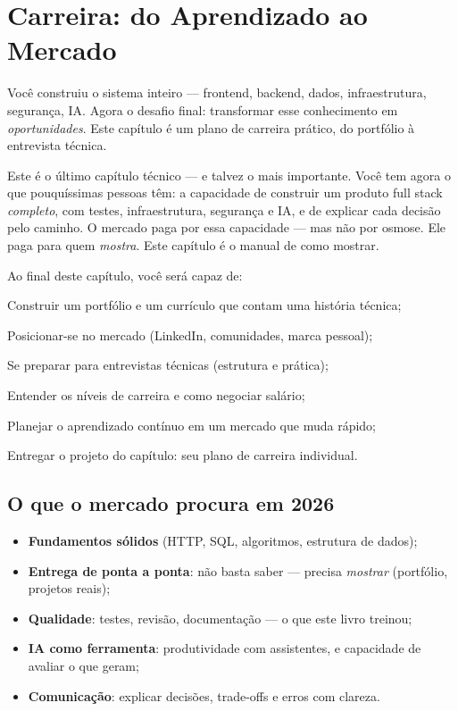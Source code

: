 \chapter{Carreira: do Aprendizado ao Mercado}
\label{cap:carreira}

\begin{caixaconceito}
Você construiu o sistema inteiro — frontend, backend, dados, infraestrutura,
segurança, IA. Agora o desafio final: transformar esse conhecimento em
\emph{oportunidades}. Este capítulo é um plano de carreira prático, do
portfólio à entrevista técnica.
\end{caixaconceito}

Este é o último capítulo técnico — e talvez o mais importante. Você tem agora
o que pouquíssimas pessoas têm: a capacidade de construir um produto full
stack \emph{completo}, com testes, infraestrutura, segurança e IA, e de
explicar cada decisão pelo caminho. O mercado paga por essa capacidade — mas
não por osmose. Ele paga para quem \emph{mostra}. Este capítulo é o manual de
como mostrar.

Ao final deste capítulo, você será capaz de:
\begin{objetivos}
  \item Construir um portfólio e um currículo que contam uma história técnica;
  \item Posicionar-se no mercado (LinkedIn, comunidades, marca pessoal);
  \item Se preparar para entrevistas técnicas (estrutura e prática);
  \item Entender os níveis de carreira e como negociar salário;
  \item Planejar o aprendizado contínuo em um mercado que muda rápido;
  \item Entregar o projeto do capítulo: seu plano de carreira individual.
\end{objetivos}

\section{O que o mercado procura em 2026}

\begin{itemize}[leftmargin=*, itemsep=0.4em]
  \item \textbf{Fundamentos sólidos} (HTTP, SQL, algoritmos, estrutura de dados);
  \item \textbf{Entrega de ponta a ponta}: não basta saber — precisa \emph{mostrar} (portfólio, projetos reais);
  \item \textbf{Qualidade}: testes, revisão, documentação — o que este livro treinou;
  \item \textbf{IA como ferramenta}: produtividade com assistentes, e capacidade de avaliar o que geram;
  \item \textbf{Comunicação}: explicar decisões, trade-offs e erros com clareza.
\end{itemize}

